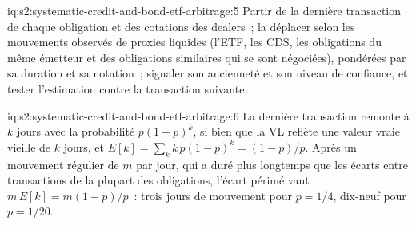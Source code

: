 \begin{solution}{iq:s2:systematic-credit-and-bond-etf-arbitrage:5}
Partir de la dernière transaction de chaque obligation et des cotations des dealers~; la déplacer selon les mouvements observés de proxies liquides (l'ETF, les CDS, les obligations du même émetteur
et des obligations similaires qui se sont négociées), pondérées par sa duration et sa notation~; signaler son ancienneté et son niveau de confiance, et tester l'estimation contre la transaction suivante.
\end{solution}

\begin{solution}{iq:s2:systematic-credit-and-bond-etf-arbitrage:6}
La dernière transaction remonte à $k$ jours avec la probabilité $p(1-p)^k$, si bien que la VL reflète une valeur vraie vieille de $k$ jours, et $E[k] = \sum_k k\, p(1-p)^k =
(1-p)/p$. Après un mouvement régulier de $m$ par jour, qui a duré plus longtemps que les écarts entre transactions de la plupart des obligations, l'écart périmé vaut $m\,E[k] = m(1-p)/p$~:
trois jours de mouvement pour $p = 1/4$, dix-neuf pour $p = 1/20$.
\end{solution}
